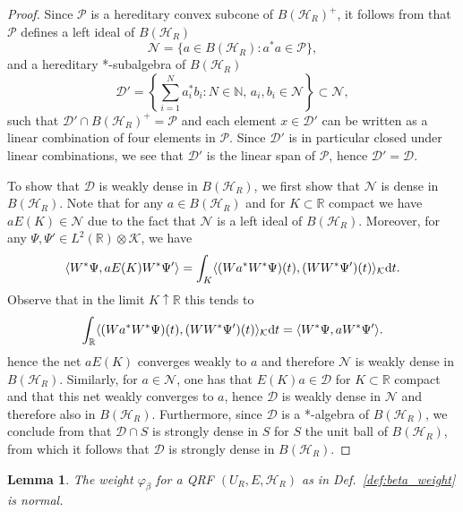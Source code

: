 \documentclass[sn-mathphys-num]{sn-jnl}%
\newcommand{\RR}{\mathbb{R}}
\newcommand{\HH}{\mathcal{H}}
\newcommand{\KK}{\mathcal{K}}
\newcommand{\diff}{\textup{d}}
\numberwithin{equation}{section}
\theoremstyle{thmstyleone}%
\newtheorem{lemma}[theorem]{Lemma}
\theoremstyle{thmstyletwo}%
\theoremstyle{thmstylethree}%
\begin{document}
\begin{proof}
    Since $\mathcal{P}$ is a hereditary convex subcone of $B(\HH_R)^+$, it follows from \cite[Lem.\ VII.1.2]{takesaki2002} that $\mathcal{P}$ defines a left ideal of $B(\HH_R)$
\begin{equation}
    \mathcal{N}=\{a\in B(\HH_R):a^*a\in\mathcal{P}\},
\end{equation}
and a hereditary *-subalgebra of $B(\HH_R)$
\begin{equation}
    \mathcal{D}'=\left\{\sum_{i=1}^N a_i^*b_i:N\in\mathbb{N},\,a_i,b_i\in\mathcal{N}\right\}\subset\mathcal{N},
\end{equation}
such that $\mathcal{D}'\cap B(\HH_R)^+=\mathcal{P}$ and each element $x\in\mathcal{D}'$ can be written as a linear combination of four elements in $\mathcal{P}$. Since $\mathcal{D}'$ is in particular closed under linear combinations, we see that $\mathcal{D}'$ is the linear span of $\mathcal{P}$, hence $\mathcal{D}'=\mathcal{D}$.

To show that $\mathcal{D}$ is weakly dense in $B(\HH_R)$, we first show that $\mathcal{N}$ is dense in $B(\HH_R)$. Note that for any $a\in B(\HH_R)$ and for $K\subset\RR$ compact we have $
    aE(K)\in \mathcal{N}$ due to the fact that $\mathcal{N}$ is a left ideal of $B(\HH_R)$. Moreover, for any $\Psi,\Psi'\in L^2(\RR)\otimes\KK$, we have
    \begin{equation}
        \langle W^*\Psi,aE(K)W^*\Psi'\rangle=\int_K\langle (Wa^*W^*\Psi)(t),(WW^*\Psi')(t)\rangle_{\KK}\diff t.
    \end{equation}
    Observe that in the limit $K\uparrow\RR$ this tends to 
    \begin{equation}
        \int_\RR\langle (Wa^*W^*\Psi)(t),(WW^*\Psi')(t)\rangle_{\KK}\diff t=\langle W^*\Psi,aW^*\Psi'\rangle.
    \end{equation}
    hence the net $aE(K)$ converges weakly to $a$ and therefore $\mathcal{N}$ is weakly dense in $B(\HH_R)$. Similarly, for $a\in\mathcal{N}$, one has that $E(K)a\in\mathcal{D}$ for $K\subset\RR$ compact and that this net weakly converges to $a$, hence $\mathcal{D}$ is weakly dense in $\mathcal{N}$ and therefore also in $B(\HH_R)$. Furthermore, since $\mathcal{D}$ is a *-algebra of $B(\HH_R)$, we conclude from \cite[Thm.\ II.2.6]{Takesaki2001} that $\mathcal{D}\cap S$ is strongly dense in $S$ for $S$ the unit ball of $B(\HH_R)$, from which it follows that $\mathcal{D}$ is strongly dense in $B(\HH_R)$.    
\end{proof}
\begin{lemma}
    \label{lem:weight_normal}
     The weight $\varphi_\beta$ for a QRF $(U_R,E,\HH_R)$ as in Def.\ \ref{def:beta_weight} is normal.
\end{lemma}
\end{document}
